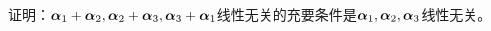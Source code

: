 \begin{frame}
  \begin{li}
    证明：$\alphabd_1+\alphabd_2,\alphabd_2+\alphabd_3,\alphabd_3+\alphabd_1$线性无关的充要条件是$\alphabd_1,\alphabd_2,\alphabd_3$线性无关。
  \end{li}
\end{frame}

